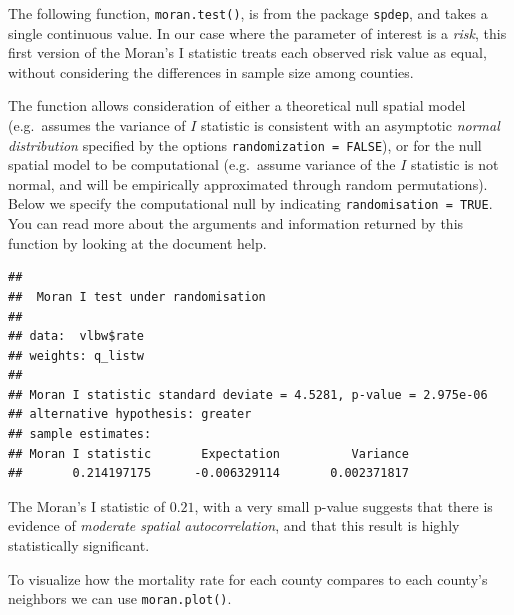\documentclass[
]{book}
\newenvironment{Shaded}{\begin{snugshade}}{\end{snugshade}}
\newcommand{\AttributeTok}[1]{\textcolor[rgb]{0.77,0.63,0.00}{#1}}
\newcommand{\FunctionTok}[1]{\textcolor[rgb]{0.00,0.00,0.00}{#1}}
\newcommand{\NormalTok}[1]{#1}
\newcommand{\SpecialCharTok}[1]{\textcolor[rgb]{0.00,0.00,0.00}{#1}}
\newcommand{\StringTok}[1]{\textcolor[rgb]{0.31,0.60,0.02}{#1}}
\begin{document}
The following function, \texttt{moran.test()}, is from the package \texttt{spdep}, and takes a single continuous value. In our case where the parameter of interest is a \emph{risk}, this first version of the Moran's I statistic treats each observed risk value as equal, without considering the differences in sample size among counties.

The function allows consideration of either a theoretical null spatial model (e.g.~assumes the variance of \(I\) statistic is consistent with an asymptotic \emph{normal distribution} specified by the options \texttt{randomization\ =\ FALSE}), or for the null spatial model to be computational (e.g.~assume variance of the \(I\) statistic is not normal, and will be empirically approximated through random permutations). Below we specify the computational null by indicating \texttt{randomisation\ =\ TRUE}. You can read more about the arguments and information returned by this function by looking at the document help.

\begin{Shaded}
\end{Shaded}

\begin{verbatim}
## 
##  Moran I test under randomisation
## 
## data:  vlbw$rate  
## weights: q_listw    
## 
## Moran I statistic standard deviate = 4.5281, p-value = 2.975e-06
## alternative hypothesis: greater
## sample estimates:
## Moran I statistic       Expectation          Variance 
##       0.214197175      -0.006329114       0.002371817
\end{verbatim}

The Moran's I statistic of \(0.21\), with a very small p-value suggests that there is evidence of \emph{moderate spatial autocorrelation}, and that this result is highly statistically significant.

To visualize how the mortality rate for each county compares to each county's neighbors we can use \texttt{moran.plot()}.

\begin{Shaded}
\end{Shaded}
\end{document}
